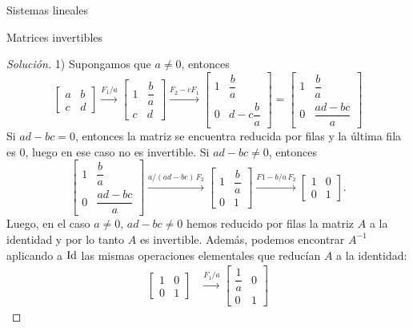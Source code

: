 \begin{chapter}{Sistemas lineales}
\begin{section}{Matrices invertibles}
\begin{proof}[Solución]
                1) Supongamos que  $a\not=0$, entonces 
                \begin{equation*}
                \begin{bmatrix}a&b\\c&d\end{bmatrix} \stackrel{F_1/a}{\longrightarrow}
                \begin{bmatrix}1&\dfrac{b}{a}\\[6pt]c&d\end{bmatrix} \stackrel{F_2 -cF_1}{\longrightarrow}
                \begin{bmatrix}1&\dfrac{b}{a}\\[6pt]0&d- c\dfrac{b}{a}\end{bmatrix} =
                \begin{bmatrix}1&\dfrac{b}{a}\\[6pt]0&\dfrac{ad-bc}{a}\end{bmatrix}
                \end{equation*}   
                Si $ad-bc=0$,  entonces la matriz se encuentra reducida por filas y la última fila es $0$, luego en ese caso no es invertible.  Si $ad-bc\not=0$, entonces
                \begin{equation*}
                \begin{bmatrix}1&\dfrac{b}{a}\\[8pt]0&\dfrac{ad-bc}{a}\end{bmatrix} \stackrel{a/(ad-bc)\,F_2}{\longrightarrow}
                \begin{bmatrix}1&\dfrac{b}{a}\\[6pt]0&1\end{bmatrix}
                \stackrel{F1-b/a\,F_2}{\longrightarrow}
                \begin{bmatrix}1&0\\0&1\end{bmatrix}.
                \end{equation*} 
                Luego, en el caso $a\not=0$, $ad-bc\not=0$ hemos reducido por filas la matriz $A$  a la identidad y por lo tanto $A$  es invertible. Además, podemos encontrar $A^{-1}$ aplicando a $\operatorname{Id}$ las mismas operaciones elementales que reducían $A$ a la identidad:
                \begin{align*}
                \begin{bmatrix}1&0\\0&1\end{bmatrix} 
                &\stackrel{F_1/a}{\longrightarrow}
                \begin{bmatrix}\dfrac1a&0\\[8pt]0&1\end{bmatrix} 

\end{align*}
\end{proof}
\end{section}
\end{chapter}
